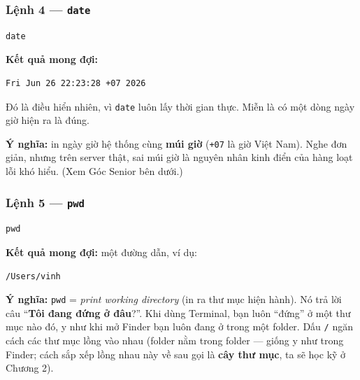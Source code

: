 \documentclass[12pt,a4paper]{article}
\begin{document}
\subsubsection{Lệnh 4 — \texttt{date}}

\begin{labbox}[Lệnh]
\begin{verbatim}
date
\end{verbatim}
\end{labbox}

\textbf{Kết quả mong đợi:}

\begin{termbox}
\begin{verbatim}
Fri Jun 26 22:23:28 +07 2026
\end{verbatim}
\end{termbox}

\begin{notebox}
Đó là điều hiển nhiên, vì \texttt{date} luôn lấy thời gian thực. Miễn là có một dòng ngày giờ hiện ra là đúng.
\end{notebox}

\textbf{Ý nghĩa:} in ngày giờ hệ thống cùng \textbf{múi giờ} (\texttt{+07} là giờ Việt Nam). Nghe đơn giản, nhưng trên server thật, sai múi giờ là nguyên nhân kinh điển của hàng loạt lỗi khó hiểu. (Xem Góc Senior bên dưới.)

\subsubsection{Lệnh 5 — \texttt{pwd}}

\begin{labbox}[Lệnh]
\begin{verbatim}
pwd
\end{verbatim}
\end{labbox}

\textbf{Kết quả mong đợi:} một đường dẫn, ví dụ:

\begin{termbox}
\begin{verbatim}
/Users/vinh
\end{verbatim}
\end{termbox}

\textbf{Ý nghĩa:} \texttt{pwd} = \textit{print working directory} (in ra thư mục hiện hành). Nó trả lời câu ``\textbf{Tôi đang đứng ở đâu}?''. Khi dùng Terminal, bạn luôn ``đứng'' ở một thư mục nào đó, y như khi mở Finder bạn luôn đang ở trong một folder. Dấu \texttt{/} ngăn cách các thư mục lồng vào nhau (folder nằm trong folder — giống y như trong Finder; cách sắp xếp lồng nhau này về sau gọi là \textbf{cây thư mục}, ta sẽ học kỹ ở Chương 2).
\end{document}
